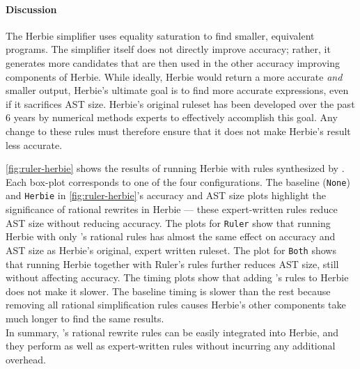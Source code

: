 \paragraph{Discussion}
The Herbie simplifier uses equality saturation
  to find smaller, equivalent programs.
The simplifier itself does not directly improve accuracy;
  rather, it generates more candidates that are then used in the other
  accuracy improving components of Herbie.
While ideally, Herbie would return a more accurate \textit{and} smaller
 output, Herbie's ultimate goal is to find more accurate expressions,
  even if it sacrifices AST size.
Herbie's original ruleset has been developed
  over the past 6 years by
  numerical methods experts to effectively
  accomplish this goal.
Any
  change to these rules
  must therefore ensure that it does not make
  Herbie's result less accurate.

\autoref{fig:ruler-herbie} shows the results of running Herbie
  with rules synthesized by .
Each box-plot corresponds to one of the four configurations.
The baseline (\lstinline{None}) and
   \lstinline{Herbie}
  in \autoref{fig:ruler-herbie}'s
  accuracy and AST size plots highlight the significance of
  rational rewrites in Herbie ---
  these expert-written rules
  reduce AST size without
  reducing accuracy.
The plots for \lstinline{Ruler}
  show that running Herbie with only 's rational rules
   has almost the same effect on accuracy and AST size
   as Herbie's original, expert written ruleset.
The plot for \lstinline{Both} shows that running Herbie together
  with Ruler's rules further reduces AST size,
  still without affecting accuracy.
The timing plots show that adding 's rules to Herbie
  does not make it slower.
The baseline timing is slower than the rest because
  removing all rational
  simplification rules causes Herbie's other components
  take much longer to find the same results.\\

In summary, 's rational rewrite rules can be easily integrated
  into Herbie, and they perform as
  well as expert-written rules without incurring any additional
  overhead.

